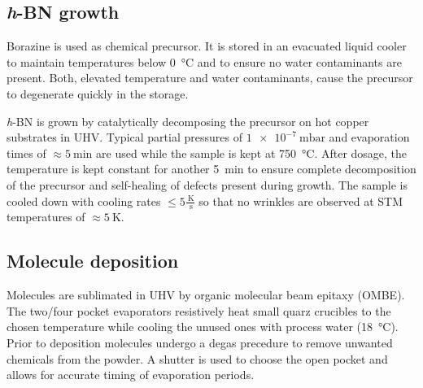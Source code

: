\subsection{\textit{h}-BN growth}
Borazine is used as chemical precursor. It is stored in an evacuated liquid cooler to maintain temperatures below \SI{0}{\celsius} and to ensure no water contaminants are present. Both, elevated temperature and water contaminants, cause the precursor to degenerate quickly in the storage.

\textit{h}-BN is grown by catalytically decomposing the precursor on hot copper substrates in UHV. Typical partial pressures of $\SI{1e-7}{\milli \bar}$ and evaporation times of $\approx \SI{5}{\minute}$ are used while the sample is kept at \SI{750}{\celsius}. After dosage, the temperature is kept constant for another \SI{5}{\minute} to ensure complete decomposition of the precursor and self-healing of defects present during growth. The sample is cooled down with cooling rates $\leq 5 \frac{\SI{}{\kelvin}}{\SI{}{\second}}$ so that no wrinkles are observed at STM temperatures of $\approx \SI{5}{\kelvin}$.

\subsection{Molecule deposition}
Molecules are sublimated in UHV by organic molecular beam epitaxy (OMBE). The two/four pocket evaporators resistively heat small quarz crucibles to the chosen temperature while cooling the unused ones with process water (\SI{18}{\celsius}). Prior to deposition molecules undergo a degas precedure to remove unwanted chemicals from the powder. A shutter is used to choose the open pocket and allows for accurate timing of evaporation periods.

